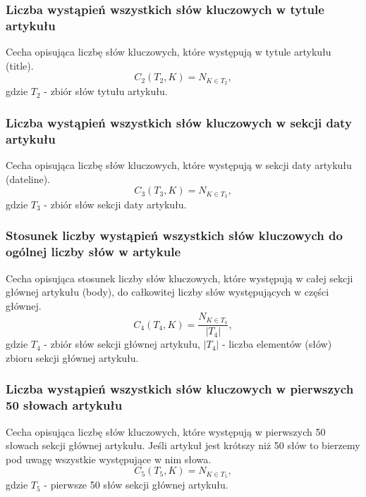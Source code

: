 \documentclass{classrep}
\begin{document}
\subsubsection{Liczba wystąpień wszystkich słów kluczowych w tytule artykułu}
Cecha opisująca liczbę słów kluczowych, które występują w tytule artykułu (title).
\begin{equation}
            C_{2}(T_{2},K) = N_{K \in T_{2}},
 \end{equation}	
 gdzie $T_{2}$ - zbiór słów tytułu artykułu.

\subsubsection{Liczba wystąpień wszystkich słów kluczowych w sekcji daty artykułu}

Cecha opisująca liczbę słów kluczowych, które występują w sekcji daty artykułu (dateline).
\begin{equation}
            C_{3}(T_{3},K) = N_{K \in T_{3}},
 \end{equation}	
 gdzie $T_{3}$ - zbiór słów sekcji daty artykułu.

\subsubsection{Stosunek liczby wystąpień wszystkich słów kluczowych do ogólnej liczby słów w artykule}
Cecha opisująca stosunek liczby słów kluczowych, które występują w całej sekcji głównej artykułu (body), do całkowitej liczby słów występujących w części głównej.
\begin{equation}
            C_{4}(T_{4},K) = \frac{N_{K \in T_{4}}} {|T_{4}|},
 \end{equation}	
 gdzie $T_{4}$ - zbiór słów sekcji głównej artykułu, $|T_{4}|$ - liczba elementów (słów) zbioru sekcji głównej artykułu.

\subsubsection{Liczba wystąpień wszystkich słów kluczowych w pierwszych 50 słowach artykułu}
Cecha opisująca liczbę słów kluczowych, które występują w pierwszych 50 słowach sekcji głównej artykułu. Jeśli artykuł jest krótszy niż 50 słów to bierzemy pod uwagę wszystkie występujące w nim słowa.
\begin{equation}
            C_{5}(T_{5},K) = N_{K \in T_{5}},
 \end{equation}	
 gdzie $T_{5}$ - pierwsze 50 słów sekcji głównej artykułu.
\end{document}

